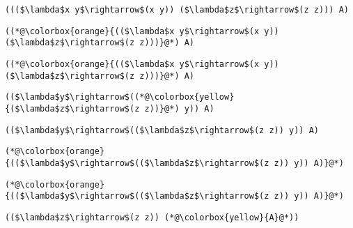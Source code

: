 \documentclass{beamer}
\begin{document}
\begin{frame}[fragile]{\CurrentSection}
\lstset{basicstyle=\ttfamily\small}\lstset{numbers=none}\lstset{language=ML}\begin{lstlisting}
((($\lambda$x y$\rightarrow$(x y)) ($\lambda$z$\rightarrow$(z z))) A)
\end{lstlisting}
\pause\lstset{language=ML}\begin{lstlisting}
((*@\colorbox{orange}{(($\lambda$x y$\rightarrow$(x y)) ($\lambda$z$\rightarrow$(z z)))}@*) A)
\end{lstlisting}

\end{frame}

\begin{frame}[fragile]{\CurrentSection}
\lstset{basicstyle=\ttfamily\small}\lstset{numbers=none}\lstset{language=ML}\begin{lstlisting}
((*@\colorbox{orange}{(($\lambda$x y$\rightarrow$(x y)) ($\lambda$z$\rightarrow$(z z)))}@*) A)
\end{lstlisting}
\pause\lstset{language=ML}\begin{lstlisting}
(($\lambda$y$\rightarrow$((*@\colorbox{yellow}{($\lambda$z$\rightarrow$(z z))}@*) y)) A)
\end{lstlisting}

\end{frame}

\begin{frame}[fragile]{\CurrentSection}
\lstset{basicstyle=\ttfamily\small}\lstset{numbers=none}\lstset{language=ML}\begin{lstlisting}
(($\lambda$y$\rightarrow$(($\lambda$z$\rightarrow$(z z)) y)) A)
\end{lstlisting}
\pause\lstset{language=ML}\begin{lstlisting}
(*@\colorbox{orange}{(($\lambda$y$\rightarrow$(($\lambda$z$\rightarrow$(z z)) y)) A)}@*)
\end{lstlisting}

\end{frame}

\begin{frame}[fragile]{\CurrentSection}
\lstset{basicstyle=\ttfamily\small}\lstset{numbers=none}\lstset{language=ML}\begin{lstlisting}
(*@\colorbox{orange}{(($\lambda$y$\rightarrow$(($\lambda$z$\rightarrow$(z z)) y)) A)}@*)
\end{lstlisting}
\pause\lstset{language=ML}\begin{lstlisting}
(($\lambda$z$\rightarrow$(z z)) (*@\colorbox{yellow}{A}@*))
\end{lstlisting}

\end{frame}
\end{document}
